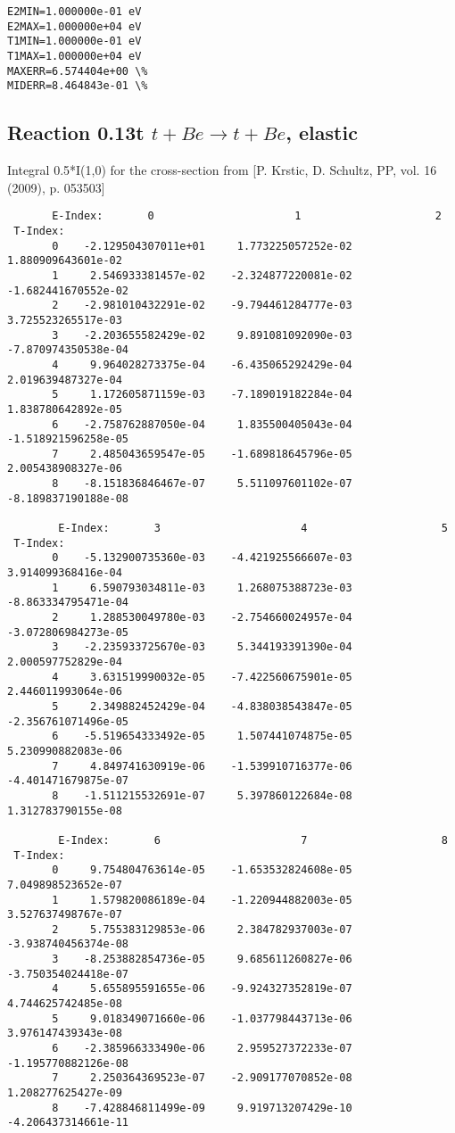 \documentclass[12pt,dvipdfmx]{article}
\begin{document}
{\begin{small}
\begin{verbatim}
E2MIN=1.000000e-01 eV
E2MAX=1.000000e+04 eV
T1MIN=1.000000e-01 eV
T1MAX=1.000000e+04 eV
MAXERR=6.574404e+00 \%
MIDERR=8.464843e-01 \%
\end{verbatim}\end{small}
\newpage

\subsection{
Reaction 0.13t  $t + Be \rightarrow t + Be$, elastic}

Integral 0.5*I(1,0) for the cross-section from [P. Krstic, D. Schultz, PP, vol. 16 (2009), p. 053503]

\begin{small}\begin{verbatim}
       E-Index:       0                      1                     2
 T-Index:
       0    -2.129504307011e+01     1.773225057252e-02     1.880909643601e-02
       1     2.546933381457e-02    -2.324877220081e-02    -1.682441670552e-02
       2    -2.981010432291e-02    -9.794461284777e-03     3.725523265517e-03
       3    -2.203655582429e-02     9.891081092090e-03    -7.870974350538e-04
       4     9.964028273375e-04    -6.435065292429e-04     2.019639487327e-04
       5     1.172605871159e-03    -7.189019182284e-04     1.838780642892e-05
       6    -2.758762887050e-04     1.835500405043e-04    -1.518921596258e-05
       7     2.485043659547e-05    -1.689818645796e-05     2.005438908327e-06
       8    -8.151836846467e-07     5.511097601102e-07    -8.189837190188e-08

        E-Index:       3                      4                     5
 T-Index:
       0    -5.132900735360e-03    -4.421925566607e-03     3.914099368416e-04
       1     6.590793034811e-03     1.268075388723e-03    -8.863334795471e-04
       2     1.288530049780e-03    -2.754660024957e-04    -3.072806984273e-05
       3    -2.235933725670e-03     5.344193391390e-04     2.000597752829e-04
       4     3.631519990032e-05    -7.422560675901e-05     2.446011993064e-06
       5     2.349882452429e-04    -4.838038543847e-05    -2.356761071496e-05
       6    -5.519654333492e-05     1.507441074875e-05     5.230990882083e-06
       7     4.849741630919e-06    -1.539910716377e-06    -4.401471679875e-07
       8    -1.511215532691e-07     5.397860122684e-08     1.312783790155e-08

        E-Index:       6                      7                     8
 T-Index:
       0     9.754804763614e-05    -1.653532824608e-05     7.049898523652e-07
       1     1.579820086189e-04    -1.220944882003e-05     3.527637498767e-07
       2     5.755383129853e-06     2.384782937003e-07    -3.938740456374e-08
       3    -8.253882854736e-05     9.685611260827e-06    -3.750354024418e-07
       4     5.655895591655e-06    -9.924327352819e-07     4.744625742485e-08
       5     9.018349071660e-06    -1.037798443713e-06     3.976147439343e-08
       6    -2.385966333490e-06     2.959527372233e-07    -1.195770882126e-08
       7     2.250364369523e-07    -2.909177070852e-08     1.208277625427e-09
       8    -7.428846811499e-09     9.919713207429e-10    -4.206437314661e-11


\end{verbatim}
\end{small}}
\end{document}
